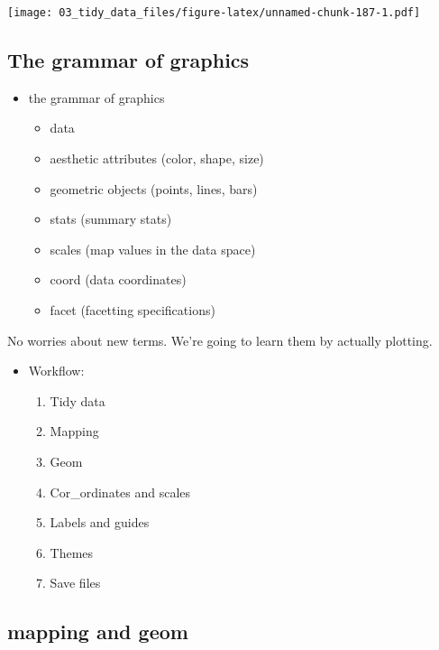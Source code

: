 \documentclass[
]{book}
\providecommand{\tightlist}{%
  \setlength{\itemsep}{0pt}\setlength{\parskip}{0pt}}
\begin{document}
\texttt{[image: 03\_tidy\_data\_files/figure-latex/unnamed-chunk-187-1.pdf]}

\hypertarget{the-grammar-of-graphics}{%
\subsection{The grammar of graphics}\label{the-grammar-of-graphics}}

\begin{itemize}
\item
  the grammar of graphics

  \begin{itemize}
  \tightlist
  \item
    data
  \item
    aesthetic attributes (color, shape, size)
  \item
    geometric objects (points, lines, bars)
  \item
    stats (summary stats)
  \item
    scales (map values in the data space)
  \item
    coord (data coordinates)
  \item
    facet (facetting specifications)
  \end{itemize}
\end{itemize}

No worries about new terms. We're going to learn them by actually plotting.

\begin{itemize}
\item
  Workflow:

  \begin{enumerate}
  \def\labelenumi{\arabic{enumi}.}
  \tightlist
  \item
    Tidy data
  \item
    Mapping
  \item
    Geom
  \item
    Cor\_ordinates and scales
  \item
    Labels and guides
  \item
    Themes
  \item
    Save files
  \end{enumerate}
\end{itemize}

\hypertarget{mapping-and-geom}{%
\subsection{mapping and geom}\label{mapping-and-geom}}
\end{document}
